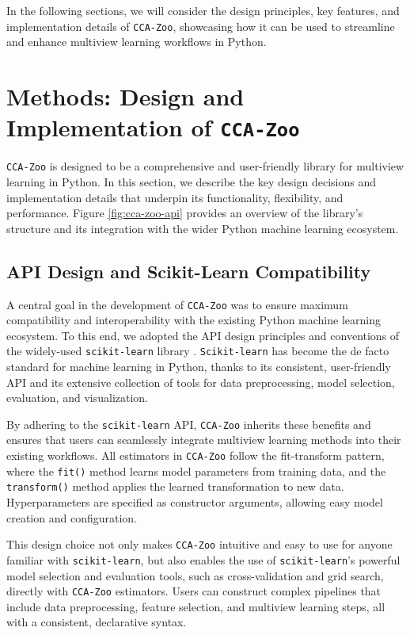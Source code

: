 In the following sections, we will consider the design principles, key features, and implementation details of \texttt{CCA-Zoo}, showcasing how it can be used to streamline and enhance multiview learning workflows in Python.

\section{Methods: Design and Implementation of \texttt{CCA-Zoo}}

\texttt{CCA-Zoo} is designed to be a comprehensive and user-friendly library for multiview learning in Python. In this section, we describe the key design decisions and implementation details that underpin its functionality, flexibility, and performance. Figure \ref{fig:cca-zoo-api} provides an overview of the library's structure and its integration with the wider Python machine learning ecosystem.

\subsection{API Design and Scikit-Learn Compatibility}

A central goal in the development of \texttt{CCA-Zoo} was to ensure maximum compatibility and interoperability with the existing Python machine learning ecosystem. To this end, we adopted the API design principles and conventions of the widely-used \texttt{scikit-learn} library \citep{pedregosa2011scikit}. \texttt{Scikit-learn} has become the de facto standard for machine learning in Python, thanks to its consistent, user-friendly API and its extensive collection of tools for data preprocessing, model selection, evaluation, and visualization.

By adhering to the \texttt{scikit-learn} API, \texttt{CCA-Zoo} inherits these benefits and ensures that users can seamlessly integrate multiview learning methods into their existing workflows. All estimators in \texttt{CCA-Zoo} follow the fit-transform pattern, where the \texttt{fit()} method learns model parameters from training data, and the \texttt{transform()} method applies the learned transformation to new data. Hyperparameters are specified as constructor arguments, allowing easy model creation and configuration.

This design choice not only makes \texttt{CCA-Zoo} intuitive and easy to use for anyone familiar with \texttt{scikit-learn}, but also enables the use of \texttt{scikit-learn}'s powerful model selection and evaluation tools, such as cross-validation and grid search, directly with \texttt{CCA-Zoo} estimators. Users can construct complex pipelines that include data preprocessing, feature selection, and multiview learning steps, all with a consistent, declarative syntax.


